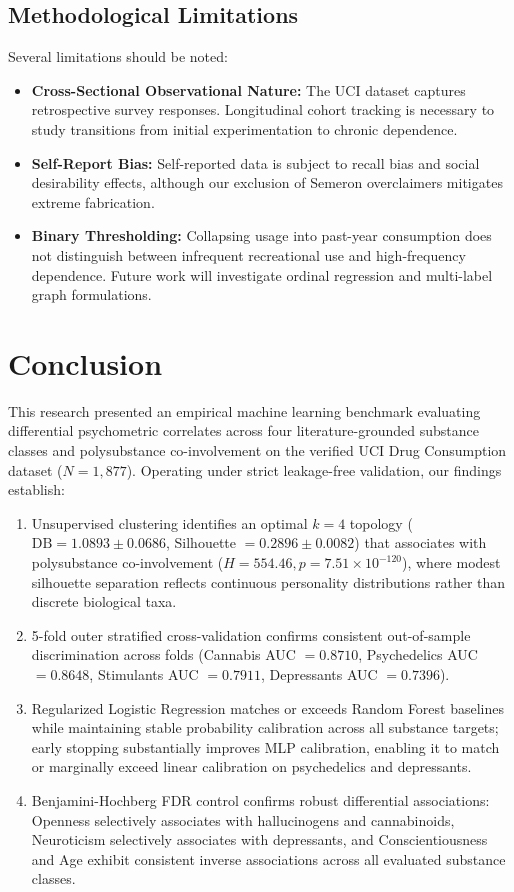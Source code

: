 \documentclass[conference]{IEEEtran}
\begin{document}
\subsection{Methodological Limitations}
Several limitations should be noted:
\begin{itemize}
    \item \textbf{Cross-Sectional Observational Nature:} The UCI dataset captures retrospective survey responses. Longitudinal cohort tracking is necessary to study transitions from initial experimentation to chronic dependence.
    \item \textbf{Self-Report Bias:} Self-reported data is subject to recall bias and social desirability effects, although our exclusion of Semeron overclaimers mitigates extreme fabrication.
    \item \textbf{Binary Thresholding:} Collapsing usage into past-year consumption does not distinguish between infrequent recreational use and high-frequency dependence. Future work will investigate ordinal regression and multi-label graph formulations.
\end{itemize}

\section{Conclusion}
This research presented an empirical machine learning benchmark evaluating differential psychometric correlates across four literature-grounded substance classes and polysubstance co-involvement on the verified UCI Drug Consumption dataset ($N = 1,877$). Operating under strict leakage-free validation, our findings establish:
\begin{enumerate}
    \item Unsupervised clustering identifies an optimal $k=4$ topology ($\text{DB} = 1.0893 \pm 0.0686$, Silhouette $= 0.2896 \pm 0.0082$) that associates with polysubstance co-involvement ($H = 554.46, p = 7.51 \times 10^{-120}$), where modest silhouette separation reflects continuous personality distributions rather than discrete biological taxa.
    \item 5-fold outer stratified cross-validation confirms consistent out-of-sample discrimination across folds (Cannabis AUC $= 0.8710$, Psychedelics AUC $= 0.8648$, Stimulants AUC $= 0.7911$, Depressants AUC $= 0.7396$).
    \item Regularized Logistic Regression matches or exceeds Random Forest baselines while maintaining stable probability calibration across all substance targets; early stopping substantially improves MLP calibration, enabling it to match or marginally exceed linear calibration on psychedelics and depressants.
    \item Benjamini-Hochberg FDR control confirms robust differential associations: Openness selectively associates with hallucinogens and cannabinoids, Neuroticism selectively associates with depressants, and Conscientiousness and Age exhibit consistent inverse associations across all evaluated substance classes.
\end{enumerate}
\end{document}
